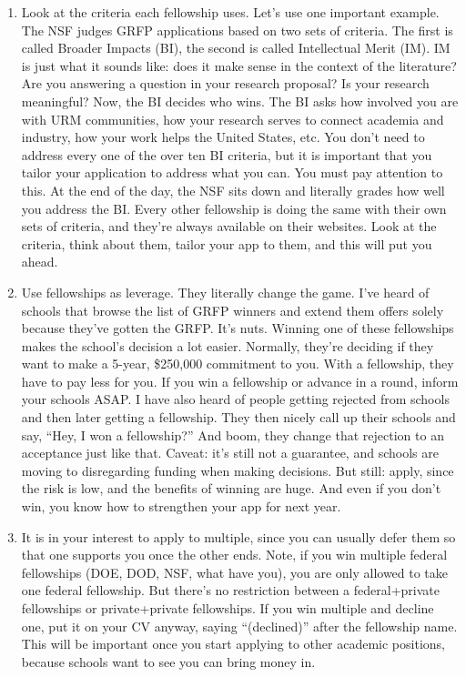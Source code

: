 \documentclass[12pt]{article}
\begin{document}
\begin{enumerate}
\item Look at the criteria each fellowship uses. Let’s use one important example. The NSF judges GRFP applications based on two sets of criteria. The first is called Broader Impacts (BI), the second is called Intellectual Merit (IM). IM is just what it sounds like: does it make sense in the context of the literature? Are you answering a question in your research proposal? Is your research meaningful? Now, the BI decides who wins. The BI asks how involved you are with URM communities, how your research serves to connect academia and industry, how your work helps the United States, etc. You don’t need to address every one of the over ten BI criteria, but it is important that you tailor your application to address what you can. You must pay attention to this. At the end of the day, the NSF sits down and literally grades how well you address the BI. Every other fellowship is doing the same with their own sets of criteria, and they’re always available on their websites. Look at the criteria, think about them, tailor your app to them, and this will put you ahead.

\item Use fellowships as leverage. They literally change the game. I’ve heard of schools that browse the list of GRFP winners and extend them offers solely because they’ve gotten the GRFP. It’s nuts. Winning one of these fellowships makes the school’s decision a lot easier. Normally, they’re deciding if they want to make a 5-year, \$250,000 commitment to you. With a fellowship, they have to pay less for you. If you win a fellowship or advance in a round, inform your schools ASAP. I have also heard of people getting rejected from schools and then later getting a fellowship. They then nicely call up their schools and say, “Hey, I won a fellowship?” And boom, they change that rejection to an acceptance just like that. Caveat: it’s still not a guarantee, and schools are moving to disregarding funding when making decisions. But still: apply, since the risk is low, and the benefits of winning are huge. And even if you don’t win, you know how to strengthen your app for next year.

\item  It is in your interest to apply to multiple, since you can usually defer them so that one supports you once the other ends. Note, if you win multiple federal fellowships (DOE, DOD, NSF, what have you), you are only allowed to take one federal fellowship. But there’s no restriction between a federal+private fellowships or private+private fellowships. If you win multiple and decline one, put it on your CV anyway, saying ``(declined)'' after the fellowship name. This will be important once you start applying to other academic positions, because schools want to see you can bring money in.


\end{enumerate}
\end{document}
